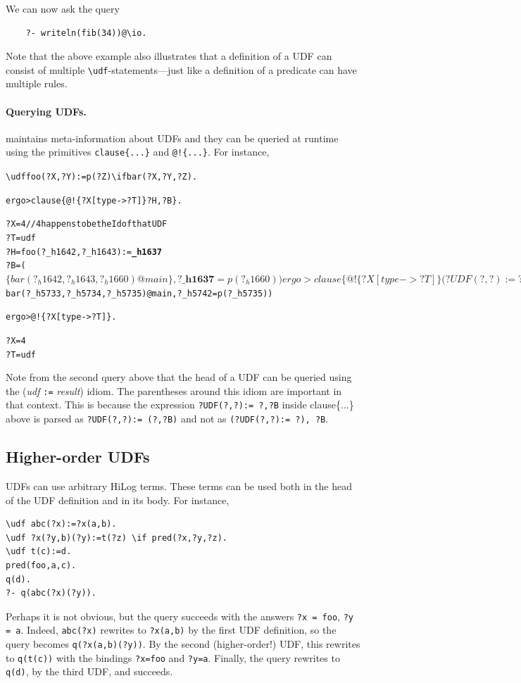 \documentclass[11pt]{article}
\newcommand{\ERGO}{\mbox{\smaller{\ensuremath{\cal{E}}\smaller{{\sc{RGO}}}}}\xspace}
\newcommand{\FLSYSTEM}{\ERGO}
\newcommand{\prompt}{ergo> }
\newcommand{\bs}{\textbackslash}
\begin{document}
We can now ask the query
\begin{verbatim}
    ?- writeln(fib(34))@\io.
\end{verbatim}
Note that the above example also illustrates that a definition of a UDF can
consist of multiple \texttt{\bs{}udf}-statements---just like a definition
of a predicate can have multiple rules. 

\paragraph{Querying UDFs.} \FLSYSTEM maintains meta-information about UDFs
and they can be queried at runtime using the primitives
\texttt{clause\{...\}} and \texttt{@!\{...\}}.
For instance, 
\begin{alltt}
  \bs{}udf foo(?X,?Y) := p(?Z) \bs{}if bar(?X,?Y,?Z).

  \prompt clause\{@!\{?X[type->?T]\} ?H,?B\}.

  ?X = 4      // 4 happens to be the Id of that UDF
  ?T = udf
  ?H = foo(?_h1642,?_h1643) := \textbf{_h1637}  
  ?B = ($\{bar(?_h1642,?_h1643,?_h1660)@main\}, ?\textbf{_h1637} = p(?_h1660))

  \prompt clause\{@!\{?X[type->?T]\} \textbf{(}?UDF(?,?) := ?s\textbf{)} ,?B\}.

  ?X = 4
  ?T = udf
  ?UDF = foo
  ?B = (${bar(?_h5733,?_h5734,?_h5735)@main}, ?_h5742 = p(?_h5735))

  \prompt @!\{?X[type->?T]\}.

  ?X = 4
  ?T = udf
\end{alltt}
Note from the second query above that the head of a UDF can be queried
using the (\emph{udf} \texttt{:=} \emph{result}) idiom.   The parentheses
around this idiom are important in that context. This is because the
expression
\texttt{?UDF(?,?):= ?,?B} inside clause\{...\} above is parsed as
\texttt{?UDF(?,?):= (?,?B)} and not
as \texttt{(?UDF(?,?):= ?), ?B}.


\subsection{Higher-order UDFs}

UDFs can use arbitrary HiLog terms. These terms can be used both in the
head of the UDF definition and in its body. For instance,
\begin{verbatim}
\udf abc(?x):=?x(a,b).
\udf ?x(?y,b)(?y):=t(?z) \if pred(?x,?y,?z).
\udf t(c):=d.
pred(foo,a,c).
q(d).
?- q(abc(?x)(?y)).
\end{verbatim}
Perhaps it is not obvious, but the query succeeds
with the answers \texttt{?x = foo}, \texttt{?y = a}.    
Indeed, \texttt{abc(?x)} rewrites to \texttt{?x(a,b)}
by the first UDF definition, so the query becomes
\texttt{q(?x(a,b)(?y))}. By the second (higher-order!) UDF, this rewrites to
\texttt{q(t(c))} with the bindings \texttt{?x=foo} and \texttt{?y=a}.
Finally, the query rewrites to \texttt{q(d)}, by the third UDF, and succeeds. 
\end{document}

